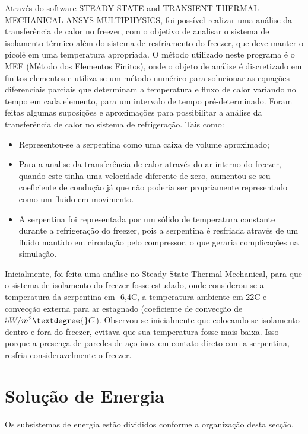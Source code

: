 \begin{itemize}
 Através do software STEADY STATE and TRANSIENT THERMAL - MECHANICAL ANSYS MULTIPHYSICS, foi possível realizar uma análise da transferência de calor no freezer, com o objetivo de analisar o sistema de isolamento térmico além do sistema de resfriamento do freezer, que deve manter o picolé em uma temperatura apropriada. O método utilizado neste programa é o MEF (Método dos Elementos Finitos), onde o objeto de análise é discretizado em finitos elementos e utiliza-se um método numérico para solucionar as equações diferenciais parciais que determinam a temperatura e fluxo de calor variando no tempo em cada elemento, para um intervalo de tempo pré-determinado.
 Foram feitas algumas suposições e aproximações para possibilitar a análise da transferência de calor no sistema de refrigeração. Tais como:
\begin{itemize}
\item Representou-se a serpentina como uma caixa de volume aproximado;
\item Para a analise da transferência de calor através do ar interno do freezer, quando este tinha uma velocidade diferente de zero, aumentou-se seu coeficiente de condução já que não poderia ser propriamente representado como um fluido em movimento.
\item A serpentina foi representada por um sólido de temperatura constante durante a refrigeração do freezer, pois a serpentina é resfriada através de um fluido mantido em circulação pelo compressor, o que geraria complicações na simulação.
\end{itemize}
 Inicialmente, foi feita uma análise no Steady State Thermal Mechanical, para que o sistema de isolamento do freezer fosse estudado, onde considerou-se a temperatura da serpentina em -6,4\textdegree{}C, a temperatura ambiente em 22\textdegree{}C e convecção externa para ar estagnado (coeficiente de convecção de $5W/m^2\textdegree{}C$). Observou-se inicialmente que colocando-se isolamento dentro e fora do freezer, evitava que sua temperatura fosse mais baixa. Isso porque a presença de paredes de aço inox em contato direto com a serpentina, resfria consideravelmente o freezer.


\end{itemize}

\section{Solução de Energia}

Os subsistemas de energia estão divididos conforme a organização desta secção.

